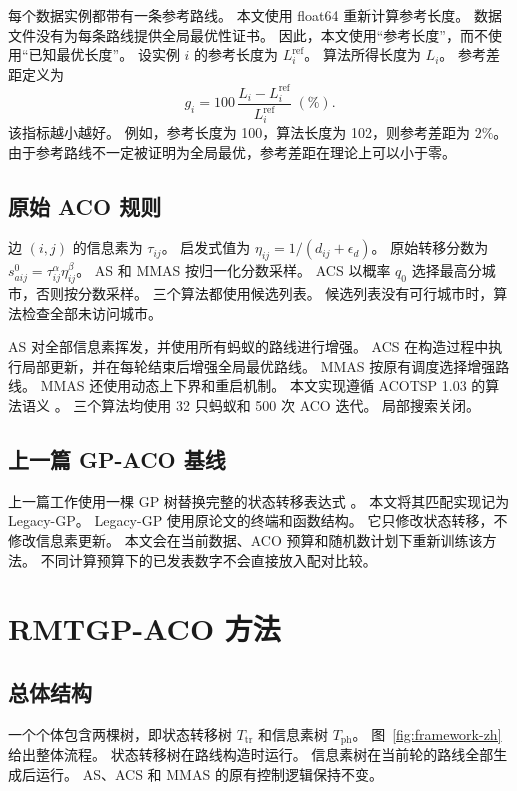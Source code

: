 \documentclass[letterpaper,journal]{IEEEtran}
\begin{document}
每个数据实例都带有一条参考路线。
本文使用 float64 重新计算参考长度。
数据文件没有为每条路线提供全局最优性证书。
因此，本文使用“参考长度”，而不使用“已知最优长度”。
设实例 \(i\) 的参考长度为 \(L_i^{\mathrm{ref}}\)。
算法所得长度为 \(L_i\)。
参考差距定义为
\begin{equation}
 g_i=100\,
 \frac{L_i-L_i^{\mathrm{ref}}}{L_i^{\mathrm{ref}}}\;(\%).
 \label{eq:reference-gap}
\end{equation}
该指标越小越好。
例如，参考长度为 100，算法长度为 102，则参考差距为 \(2\%\)。
由于参考路线不一定被证明为全局最优，参考差距在理论上可以小于零。

\subsection{原始 ACO 规则}

边 \((i,j)\) 的信息素为 \(\tau_{ij}\)。
启发式值为 \(\eta_{ij}=1/(d_{ij}+\epsilon_d)\)。
原始转移分数为 \(s^0_{aij}=\tau_{ij}^{\alpha}\eta_{ij}^{\beta}\)。
AS 和 MMAS 按归一化分数采样。
ACS 以概率 \(q_0\) 选择最高分城市，否则按分数采样。
三个算法都使用候选列表。
候选列表没有可行城市时，算法检查全部未访问城市。

AS 对全部信息素挥发，并使用所有蚂蚁的路线进行增强。
ACS 在构造过程中执行局部更新，并在每轮结束后增强全局最优路线。
MMAS 按原有调度选择增强路线。
MMAS 还使用动态上下界和重启机制。
本文实现遵循 ACOTSP 1.03 的算法语义 \cite{stutzle2004acotsp}。
三个算法均使用 32 只蚂蚁和 500 次 ACO 迭代。
局部搜索关闭。

\subsection{上一篇 GP-ACO 基线}

上一篇工作使用一棵 GP 树替换完整的状态转移表达式
\cite{lin2025gpaco}。
本文将其匹配实现记为 Legacy-GP。
Legacy-GP 使用原论文的终端和函数结构。
它只修改状态转移，不修改信息素更新。
本文会在当前数据、ACO 预算和随机数计划下重新训练该方法。
不同计算预算下的已发表数字不会直接放入配对比较。

\section{RMTGP-ACO 方法}

\subsection{总体结构}

一个个体包含两棵树，即状态转移树 \(T_{\mathrm{tr}}\) 和信息素树
\(T_{\mathrm{ph}}\)。
图~\ref{fig:framework-zh} 给出整体流程。
状态转移树在路线构造时运行。
信息素树在当前轮的路线全部生成后运行。
AS、ACS 和 MMAS 的原有控制逻辑保持不变。
\end{document}
